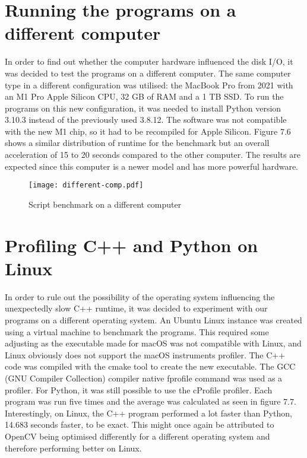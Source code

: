 \section{Running the programs on a different computer}
In order to find out whether the computer hardware influenced the disk I/O, it was decided to test the programs on a different computer. The same computer type in a different configuration was utilised: the MacBook Pro from 2021 with an M1 Pro Apple Silicon CPU, 32 GB of RAM and a 1 TB SSD. To run the programs on this new configuration, it was needed to install Python version 3.10.3 instead of the previously used 3.8.12. The software was not compatible with the new M1 chip, so it had to be recompiled for Apple Silicon.
Figure 7.6 shows a similar distribution of runtime for the benchmark but an overall acceleration of 15 to 20 seconds compared to the other computer. The results are expected since this computer is a newer model and has more powerful hardware.

\begin{figure}[H]
	\centering
	\texttt{[image: different-comp.pdf]}
	\caption{Script benchmark on a different computer}
	\label{figure:different-comp}
\end{figure}

\section{Profiling C++ and Python on Linux}
In order to rule out the possibility of the operating system influencing the unexpectedly slow C++ runtime, it was decided to experiment with our programs on a different operating system. An Ubuntu Linux instance was created using a virtual machine to benchmark the programs. This required some adjusting as the executable made for macOS was not compatible with Linux, and Linux obviously does not support the macOS instruments profiler. The C++ code was compiled with the cmake tool \cite{cmake} to create the new executable. The GCC (GNU Compiler Collection) \cite{gcc} compiler native fprofile command was used as a profiler. For Python, it was still possible to use the cProfile profiler. Each program was run five times and the average was calculated as seen in figure 7.7.
Interestingly, on Linux, the C++ program performed a lot faster than Python, 14.683 seconds faster, to be exact. This might once again be attributed to OpenCV being optimised differently for a different operating system and therefore performing better on Linux.

